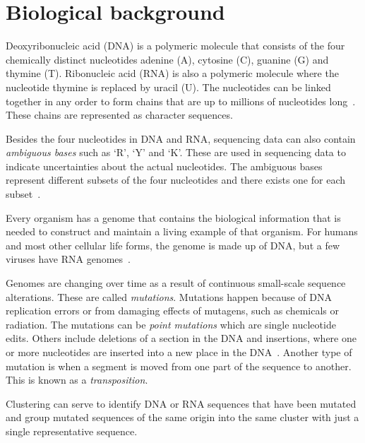 \section{Biological background}
\label{sec:biology}

Deoxyribonucleic acid (DNA) is a polymeric molecule that consists of the four
chemically distinct nucleotides adenine (A), cytosine (C), guanine (G) and
thymine (T). Ribonucleic acid (RNA) is also a polymeric molecule where the
nucleotide thymine is replaced by uracil (U). The nucleotides can be linked
together in any order to form chains that are up to millions of nucleotides
long~\cite[pp.~8--9]{brown}. These chains are represented as character
sequences.

Besides the four nucleotides in DNA and RNA, sequencing data can also contain
\emph{ambiguous bases} such as `R', `Y' and `K'. These are used in sequencing
data to indicate uncertainties about the actual nucleotides. The ambiguous
bases represent different subsets of the four nucleotides and there exists one
for each subset~\cite{tao}.

Every organism has a genome that contains the biological information that is
needed to construct and maintain a living example of that organism. For humans
and most other cellular life forms, the genome is made up of DNA, but a few
viruses have RNA genomes~\cite[pp.~3--4]{brown}.

Genomes are changing over time as a result of continuous small-scale sequence
alterations. These are called \textit{mutations}. Mutations happen because of
DNA replication errors or from damaging effects of mutagens, such as chemicals
or radiation. The mutations can be \textit{point mutations} which are single
nucleotide edits. Others include deletions of a section in the DNA and
insertions, where one or more nucleotides are inserted into a new place in the
DNA~\cite[pp.~505--506]{brown}. Another type of mutation is when a segment is
moved from one part of the sequence to another. This is known as a
\emph{transposition}.

Clustering can serve to identify DNA or RNA sequences that have been mutated
and group mutated sequences of the same origin into the same cluster with just
a single representative sequence.
